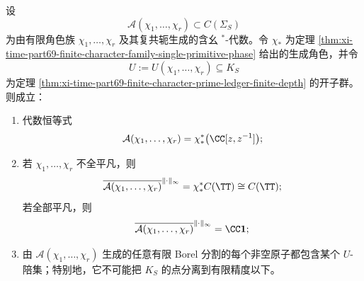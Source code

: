 \begin{theorem}\label{thm:xi-time-part69-finite-trigonometric-audit-algebra-single-circle-finite-tail}
设
\[
\mathcal A(\chi_1,\dots,\chi_r)\subset C(\Sigma_S)
\]
为由有限角色族 \(\chi_1,\dots,\chi_r\) 及其复共轭生成的含幺 \(^\ast\)-代数。令 \(\chi_\ast\) 为定理 \ref{thm:xi-time-part69-finite-character-family-single-primitive-phase} 给出的生成角色，并令
\[
U:=U(\chi_1,\dots,\chi_r)\subseteq K_S
\]
为定理 \ref{thm:xi-time-part69-finite-character-prime-ledger-finite-depth} 的开子群。则成立：
\begin{enumerate}
  \item 代数恒等式
  \[
  \mathcal A(\chi_1,\dots,\chi_r)
  =
  \chi_\ast^{*}\bigl(\CC[z,z^{-1}]\bigr);
  \]
  \item 若 \(\chi_1,\dots,\chi_r\) 不全平凡，则
  \[
  \overline{\mathcal A(\chi_1,\dots,\chi_r)}^{\|\cdot\|_\infty}
  =
  \chi_\ast^{*}C(\TT)
  \cong
  C(\TT);
  \]
  若全部平凡，则
  \[
  \overline{\mathcal A(\chi_1,\dots,\chi_r)}^{\|\cdot\|_\infty}
  =
  \CC\mathbf 1;
  \]
  \item 由 \(\mathcal A(\chi_1,\dots,\chi_r)\) 生成的任意有限 Borel 分割的每个非空原子都包含某个 \(U\)-陪集；特别地，它不可能把 \(K_S\) 的点分离到有限精度以下。
\end{enumerate}
\end{theorem}
